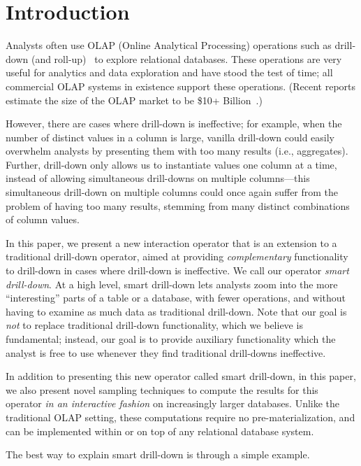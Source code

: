 

\section{Introduction}
Analysts often use OLAP (Online Analytical Processing) operations
such as drill-down (and roll-up)~\cite{export:69578} to explore
relational databases. 
These operations are very useful for analytics and data exploration and have stood the test of time;
all commercial OLAP systems 
in existence support these operations. (Recent reports estimate the size of the OLAP market to be \$10+ Billion~\cite{gartner}.)


However, there are cases where drill-down is ineffective; 
for example, when the number of distinct values
in a column is large, vanilla drill-down 
could easily overwhelm analysts by presenting them with too many 
results (i.e., aggregates). 
Further, drill-down only allows us to instantiate values
 one column at a time, instead of allowing simultaneous drill-downs
on multiple columns---this simultaneous drill-down on multiple columns 
could once again suffer from the problem
of having too many results, stemming from many distinct combinations of column values.

In this paper, we present a new interaction operator 
that is an extension to a traditional 
drill-down operator, aimed at providing {\em complementary}
functionality to drill-down in cases where drill-down is
ineffective. We call our operator {\em smart drill-down}.
At a high level, smart drill-down lets analysts zoom into
the more ``interesting'' parts of a table or a database,
with fewer operations, and without having to examine as much
data as traditional drill-down.
Note that our goal is {\em not} to replace traditional 
drill-down functionality, which we believe is fundamental;
instead, our goal is to provide auxiliary functionality 
which the analyst is free to use whenever they find 
traditional drill-downs ineffective.

In addition to presenting this new operator called smart drill-down, in this paper, 
we also present novel sampling techniques to compute the results for this
operator {\em in an interactive fashion} on increasingly larger databases. 
Unlike the traditional OLAP setting, these computations 
require no pre-materialization, and can be implemented 
within or on top of any relational database system.



The best way to explain smart drill-down is through a simple example.

